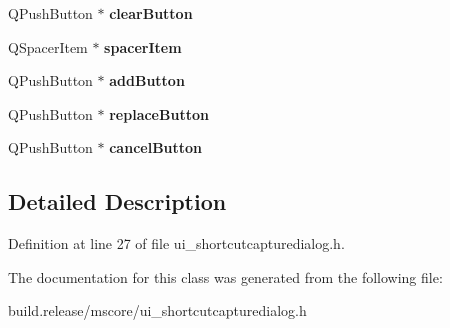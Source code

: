 \begin{DoxyCompactItemize}
Q\+Push\+Button $\ast$ {\bfseries clear\+Button}
\item 
\mbox{\label{class_ui___shortcut_capture_dialog_base_a734d18ac9ee9187a0e90e5d1dac9dd0b}} 
Q\+Spacer\+Item $\ast$ {\bfseries spacer\+Item}
\item 
\mbox{\label{class_ui___shortcut_capture_dialog_base_a1d20f6394a20db2154ae005e38017bbf}} 
Q\+Push\+Button $\ast$ {\bfseries add\+Button}
\item 
\mbox{\label{class_ui___shortcut_capture_dialog_base_aaf44c704369167daab5fe805a8a6bc11}} 
Q\+Push\+Button $\ast$ {\bfseries replace\+Button}
\item 
\mbox{\label{class_ui___shortcut_capture_dialog_base_a8ff15648c7ea3a0592e7bf09a7c0d249}} 
Q\+Push\+Button $\ast$ {\bfseries cancel\+Button}
\end{DoxyCompactItemize}


\subsection{Detailed Description}


Definition at line 27 of file ui\+\_\+shortcutcapturedialog.\+h.



The documentation for this class was generated from the following file\+:\begin{DoxyCompactItemize}
\item 
build.\+release/mscore/ui\+\_\+shortcutcapturedialog.\+h\end{DoxyCompactItemize}

